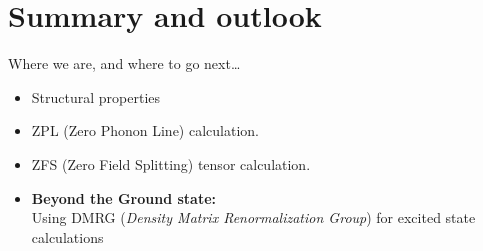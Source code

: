 \documentclass[notes=hide]{beamer}
\begin{document}
\section{Summary and outlook} %




\begin{frame}{Where we are, and where to go next\ldots}
  \begin{itemize}
    \item Structural properties
    \item ZPL (Zero Phonon Line) calculation.
    \item ZFS (Zero Field Splitting) tensor calculation.
    \item \textbf{Beyond the Ground state:}\\
      Using DMRG (\textit{Density Matrix Renormalization Group}) for excited state calculations
  \end{itemize}
\end{frame}




\end{document}

